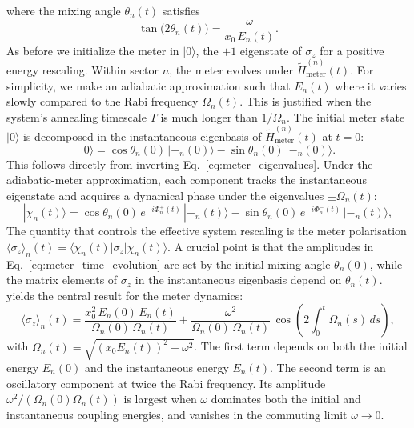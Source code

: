where the mixing angle $\theta_n(t)$ satisfies
\begin{equation}\label{eq:mixing_angle}
    \tan\bigl(2\theta_n(t)\bigr) = \frac{\omega}{x_0\,E_n(t)}.
\end{equation}
\qquad As before we initialize the meter in $|0\rangle$, the $+1$ eigenstate of $\sigma_z$ for a positive energy rescaling. Within sector $n$, the meter evolves under $\tilde{H}_{\text{meter}}^{(n)}(t)$. For simplicity, we make an adiabatic approximation such that $E_n(t)$ where it varies slowly compared to the Rabi frequency $\Omega_n(t)$. This is justified when the system's annealing timescale $T$ is much longer than $1/\Omega_n$. The initial meter state $|0\rangle$ is decomposed in the instantaneous eigenbasis of $\tilde{H}_{\text{meter}}^{(n)}(t)$ at $t=0$:
\begin{equation}\label{eq:meter_decomposition}
    |0\rangle = \cos\theta_n(0)\,|+_n(0)\rangle - \sin\theta_n(0)\,|-_n(0)\rangle.
\end{equation}
This follows directly from inverting Eq.~\eqref{eq:meter_eigenvalues}. Under the adiabatic-meter approximation, each component tracks the instantaneous eigenstate and acquires a dynamical phase under the eigenvalues $\pm\Omega_n(t)$:
\begin{equation}\label{eq:meter_time_evolution}
    |\chi_n(t)\rangle = \cos\theta_n(0)\,e^{-i\Phi_n^{+}(t)}\,|+_n(t)\rangle - \sin\theta_n(0)\,e^{-i\Phi_n^{-}(t)}\,|-_n(t)\rangle,
\end{equation}
\qquad The quantity that controls the effective system rescaling is the meter polarisation $\langle\sigma_z\rangle_n(t) = \langle\chi_n(t)|\sigma_z|\chi_n(t)\rangle$. A crucial point is that the amplitudes in Eq.~\eqref{eq:meter_time_evolution} are set by the initial mixing angle $\theta_n(0)$, while the matrix elements of $\sigma_z$ in the instantaneous eigenbasis depend on $\theta_n(t)$.  yields the central result for the meter dynamics:
\begin{equation}\label{eq:sigma_z_final}
    \langle\sigma_z\rangle_n(t) = \frac{x_0^2\,E_n(0)\,E_n(t)}{\Omega_n(0)\,\Omega_n(t)} + \frac{\omega^2}{\Omega_n(0)\,\Omega_n(t)}\,\cos\!\left(2\int_0^t \Omega_n(s)\,ds\right),
\end{equation}
with $\Omega_n(t) = \sqrt{(x_0 E_n(t))^2 + \omega^2}$. The first term depends on both the initial energy $E_n(0)$ and the instantaneous energy $E_n(t)$. The second term is an oscillatory component at twice the Rabi frequency. Its amplitude $\omega^2/(\Omega_n(0)\Omega_n(t))$ is largest when $\omega$ dominates both the initial and instantaneous coupling energies, and vanishes in the commuting limit $\omega \to 0$.


